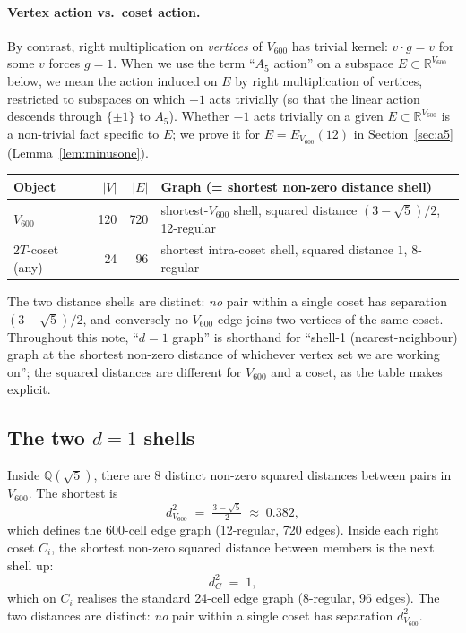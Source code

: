 \documentclass[11pt]{article}
\newcommand{\Vsix}{V_{600}}
\newcommand{\Esix}{E_{\Vsix}}
\newcommand{\twoT}{2T}
\theoremstyle{plain}
\theoremstyle{definition}
\begin{document}
\paragraph{Vertex action vs.\ coset action.}
By contrast, right multiplication on \emph{vertices} of $\Vsix$ has
trivial kernel: $v \cdot g = v$ for some $v$ forces $g = 1$.  When
we use the term ``$A_5$ action'' on a subspace $E\subset
\mathbb{R}^{\Vsix}$ below, we mean the action induced on $E$ by
right multiplication of vertices, restricted to subspaces on which
$-1$ acts trivially (so that the linear action descends through
$\{\pm 1\}$ to $A_5$).  Whether $-1$ acts trivially on a given
$E\subset\mathbb{R}^{\Vsix}$ is a non-trivial fact specific to $E$;
we prove it for $E = \Esix(12)$ in
Section~\ref{sec:a5} (Lemma~\ref{lem:minusone}).

\medskip
\noindent
\begin{tabular}{lrrl}
\toprule
Object & $|V|$ & $|E|$ & Graph (= shortest non-zero distance shell)\\
\midrule
$\Vsix$ & 120 & 720 & shortest-$\Vsix$ shell, squared distance $(3-\sqrt5)/2$, 12-regular\\
$\twoT$-coset (any) & 24 & 96 & shortest intra-coset shell, squared distance $1$, 8-regular\\
\bottomrule
\end{tabular}

\smallskip\noindent
The two distance shells are distinct: \emph{no} pair within a single
coset has separation $(3-\sqrt5)/2$, and conversely no $\Vsix$-edge
joins two vertices of the same coset.  Throughout this note, ``$d{=}1$
graph'' is shorthand for ``shell-1 (nearest-neighbour) graph at the
shortest non-zero distance of whichever vertex set we are working on'';
the squared distances are different for $\Vsix$ and a coset, as the
table makes explicit.

\subsection{The two $d{=}1$ shells}\label{sec:two-shells}

Inside $\mathbb{Q}(\sqrt5)$, there are 8 distinct non-zero squared
distances between pairs in $\Vsix$.  The shortest is
\[
  d^2_{V_{600}} \;=\; \tfrac{3-\sqrt5}{2} \;\approx\; 0.382,
\]
which defines the 600-cell edge graph (12-regular, 720 edges).
Inside each right coset $C_i$, the shortest non-zero squared distance
between members is the next shell up:
\[
  d^2_C \;=\; 1,
\]
which on $C_i$ realises the standard 24-cell edge graph (8-regular,
96 edges).  The two distances are distinct: \emph{no} pair within a
single coset has separation $d^2_{V_{600}}$.
\end{document}
